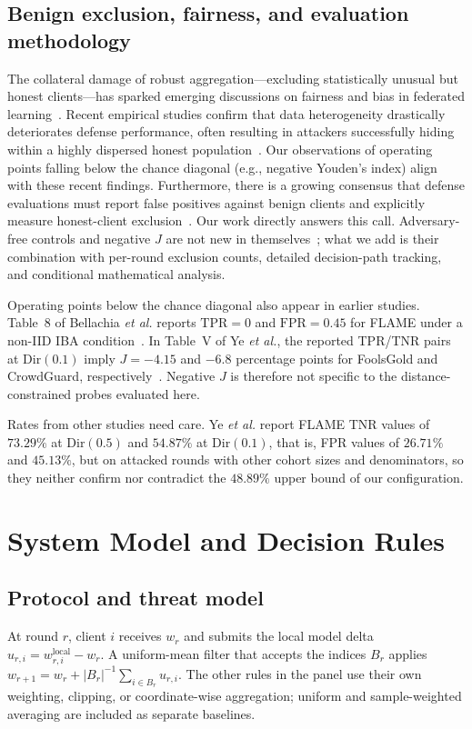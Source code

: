 \documentclass[journal]{IEEEtran}
\begin{document}
\subsection{Benign exclusion, fairness, and evaluation methodology}
The collateral damage of robust aggregation---excluding statistically unusual but honest clients---has sparked emerging discussions on fairness and bias in federated learning~\cite{singh2023fair,touat2023bias,ajibuwa2025fairness}. Recent empirical studies confirm that data heterogeneity drastically deteriorates defense performance, often resulting in attackers successfully hiding within a highly dispersed honest population~\cite{li2025heterogeneity,ye2025illusion,bellachia2026sok}. Our observations of operating points falling below the chance diagonal (e.g., negative Youden's index) align with these recent findings. Furthermore, there is a growing consensus that defense evaluations must report false positives against benign clients and explicitly measure honest-client exclusion~\cite{djemaa2026heterogeneity,abad2025evaluation}. Our work directly answers this call. Adversary-free controls and negative $J$ are not new in themselves~\cite{ye2025illusion,bellachia2026sok,li2024experimental}; what we add is their combination with per-round exclusion counts, detailed decision-path tracking, and conditional mathematical analysis.

Operating points below the chance diagonal also appear in earlier studies. Table~8 of Bellachia \emph{et al.} reports $\mathrm{TPR}=0$ and $\mathrm{FPR}=0.45$ for FLAME under a non-IID IBA condition~\cite{bellachia2026sok}. In Table~V of Ye \emph{et al.}, the reported TPR/TNR pairs at $\mathrm{Dir}(0.1)$ imply $J=-4.15$ and $-6.8$ percentage points for FoolsGold and CrowdGuard, respectively~\cite{ye2025illusion}. Negative $J$ is therefore not specific to the distance-constrained probes evaluated here.

Rates from other studies need care. Ye \emph{et al.} report FLAME TNR values of $73.29\%$ at $\mathrm{Dir}(0.5)$ and $54.87\%$ at $\mathrm{Dir}(0.1)$, that is, FPR values of $26.71\%$ and $45.13\%$, but on attacked rounds with other cohort sizes and denominators, so they neither confirm nor contradict the $48.89\%$ upper bound of our configuration.

\section{System Model and Decision Rules}\label{sec:model}
\subsection{Protocol and threat model}
At round $r$, client $i$ receives $w_r$ and submits the local model delta $u_{r,i}=w^{\mathrm{local}}_{r,i}-w_r$. A uniform-mean filter that accepts the indices $B_r$ applies $w_{r+1}=w_r+|B_r|^{-1}\sum_{i\in B_r}u_{r,i}$. The other rules in the panel use their own weighting, clipping, or coordinate-wise aggregation; uniform and sample-weighted averaging are included as separate baselines.
\end{document}
